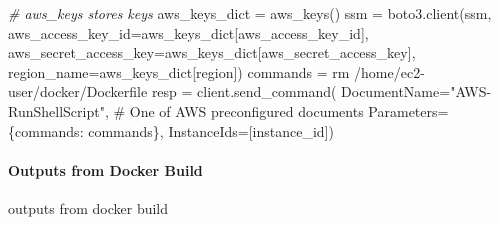 \documentclass[
]{book}
\newenvironment{Shaded}{\begin{snugshade}}{\end{snugshade}}
\newcommand{\CommentTok}[1]{\textcolor[rgb]{0.56,0.35,0.01}{\textit{#1}}}
\newcommand{\ExtensionTok}[1]{#1}
\newcommand{\NormalTok}[1]{#1}
\newcommand{\StringTok}[1]{\textcolor[rgb]{0.31,0.60,0.02}{#1}}
\newcommand{\VariableTok}[1]{\textcolor[rgb]{0.00,0.00,0.00}{#1}}
\begin{document}
\begin{Shaded}
\begin{Highlighting}[]
\CommentTok{\# aws\_keys stores keys}
\ExtensionTok{aws\_keys\_dict}\NormalTok{ = aws\_keys()}
\ExtensionTok{ssm}\NormalTok{ = boto3.client(}\StringTok{\textquotesingle{}ssm\textquotesingle{}}\NormalTok{,}
                   \VariableTok{aws\_access\_key\_id=}\NormalTok{aws\_keys\_dict[}\StringTok{\textquotesingle{}aws\_access\_key\_id\textquotesingle{}}\NormalTok{],}
                   \VariableTok{aws\_secret\_access\_key=}\NormalTok{aws\_keys\_dict[}\StringTok{\textquotesingle{}aws\_secret\_access\_key\textquotesingle{}}\NormalTok{],}
                   \VariableTok{region\_name=}\NormalTok{aws\_keys\_dict[}\StringTok{\textquotesingle{}region\textquotesingle{}}\NormalTok{])}
\ExtensionTok{commands}\NormalTok{ = }\StringTok{\textquotesingle{}rm /home/ec2{-}user/docker/Dockerfile\textquotesingle{}}
\ExtensionTok{resp}\NormalTok{ = client.send\_command(}
        \VariableTok{DocumentName=}\StringTok{"AWS{-}RunShellScript"}\NormalTok{, \# }\ExtensionTok{One}\NormalTok{ of AWS}\StringTok{\textquotesingle{} preconfigured documents}
\StringTok{        Parameters=\{\textquotesingle{}}\NormalTok{commands}\StringTok{\textquotesingle{}: commands\},}
\StringTok{        InstanceIds=[instance\_id])}
\end{Highlighting}
\end{Shaded}

\hypertarget{outputs-from-docker-build}{%
\paragraph{Outputs from Docker Build}\label{outputs-from-docker-build}}

outputs from docker build
\end{document}
